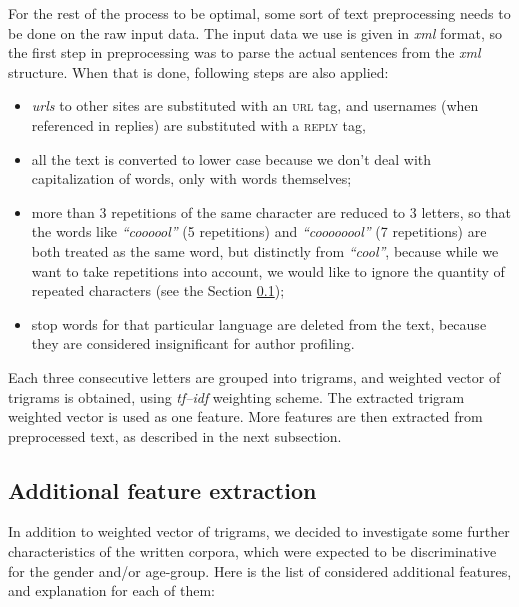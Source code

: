 \documentclass[10pt, a4paper]{article}
\begin{document}
For the rest of the process to be optimal, some sort of text preprocessing needs to be done on the raw input data.
The input data we use is given in \textit{xml} format, so the first step in preprocessing was to parse the actual sentences from the \textit{xml} structure.
When that is done, following steps are also applied:
\begin{itemize}
	\item \textit{urls} to other sites are substituted with an \textsc{url} tag, and usernames (when referenced in replies) are substituted with a \textsc{reply} tag,
	\item all the text is converted to lower case because we don't deal with capitalization of words, only with words themselves;
	\item more than 3 repetitions of the same character are reduced to 3 letters, so that the words like \textit{``coooool''} (5 repetitions) and \textit{``coooooool''} (7 repetitions) are both treated as the same word, but distinctly from \textit{``cool''}, because while we want to take repetitions into account, we would like to ignore the quantity of repeated characters (see the Section \ref{sec:features});
	\item stop words\citep{nltk} for that particular language are deleted from the text, because they are considered insignificant for author profiling.
\end{itemize}

Each three consecutive letters are grouped into trigrams, and weighted vector of trigrams is obtained, using \textit{tf--idf} weighting scheme.
The extracted trigram weighted vector is used as one feature.
More features are then extracted from preprocessed text, as described in the next subsection.

\subsection{Additional feature extraction}
\label{sec:features}
In addition to weighted vector of trigrams, we decided to investigate some further characteristics of the written corpora, which were expected to be discriminative for the gender and/or age-group.
Here is the list of considered additional features, and explanation for each of them:
\end{document}
